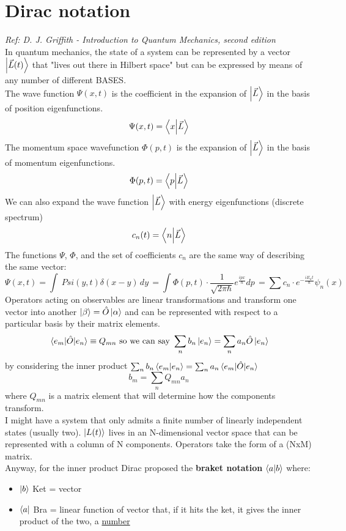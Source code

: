 \chapter{Dirac notation}
\textit{Ref: D. J. Griffith - Introduction to Quantum Mechanics, second edition}\\

In quantum mechanics, the state of a system can be represented by a vector $\ket{\vec{L}(t)}$ that "lives out there in Hilbert space" but can be expressed by means of any number of different BASES.\\
The wave function $\Psi(x,t)$ is the coefficient in the expansion of $\ket{\vec{L}}$ in the basis of position eigenfunctions.
\[
\Psi(x,t)=\braket{x}{\vec{L}}
\]
The momentum space wavefunction $\Phi(p,t)$ is the expansion of $\ket{\vec{L}}$ in the basis of momentum eigenfunctions.
\[
\Phi(p,t)=\braket{p}{\vec{L}}
\]
We can also expand the wave function $\ket{\vec{L}}$ with energy eigenfunctions (discrete spectrum)
\[
c_n(t)=\braket{n}{\vec{L}}
\]
The functions $\Psi$, $\Phi$, and the set of coefficients ${c_n}$ are the same way of describing the same vector:
\[
\Psi(x,t)=\int\ Psi(y,t)\delta(x-y)\,dy\,=\int\Phi(p,t)\cdot\frac{1}{\sqrt{2\pi \hbar}}e^{\frac{ipx}{\hbar}}dp\,=\sum c_n\cdot e^{-\frac{iE_nt}{\hbar}}\psi_n(x)
\]
Operators acting on observables are linear transformations and transform one vector into another $\ket{\beta}=\hat{O}\ket{\alpha}$ and can be represented with respect to a particular basis by their matrix elements.
\[
\mel{e_m}{\hat{O}}{e_n}\equiv Q_{mn} \text{ so we can say }
\sum_n b_n\ket{e_n}=\sum_na_n\hat{O}\ket{e_n}
\]
by considering the inner product $\sum_nb_n\braket{e_m}{e_n}=\sum_na_n\mel{e_m}{\hat{O}}{e_n}$
\[
b_m=\sum_nQ_{mn}a_n
\]
where $Q_{mn}$ is a matrix element that will determine how the components transform.\\
I might have a system that only admits a finite number of linearly independent states (usually two). $\ket{L(t)}$ lives in an N-dimensional vector space that can be represented with a column of N components. Operators take the form of a (NxM) matrix.\\
Anyway, for the inner product Dirac proposed the \textbf{braket notation} $\braket{a}{b}$ where:
\begin{itemize}
    \item $\ket{b}$ Ket = vector
    \item $\bra{a}$ Bra = linear function of vector that, if it hits the ket, it gives the inner product of the two, a \underline{number}
\end{itemize}
